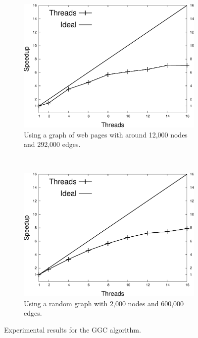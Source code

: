\newcommand{\plotsize}{0.38\textwidth}

\begin{figure}[h]
   \vspace{-0.7\intextsep}
   \centering
   \begin{subfigure}[b]{\plotsize}
      \includegraphics[width=\textwidth]{speedup_greedy-graph-coloring-search_engines.pdf}
      \caption{Using a graph of web pages with around 12,000 nodes and 292,000 edges.}
   \end{subfigure}
   ~~~~
   \begin{subfigure}[b]{\plotsize}
      \includegraphics[width=\textwidth]{speedup_greedy-graph-coloring-2000.pdf}
      \caption{Using a random graph with 2,000 nodes and 600,000 edges.\newline}
   \end{subfigure}
   \caption{Experimental results for the GGC algorithm.}
   \label{exp:graph_coloring}
   \vspace{-0.1\intextsep}
\end{figure}

